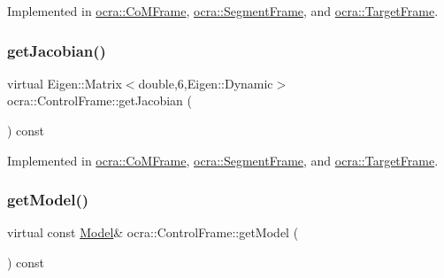 Implemented in \hyperlink{classocra_1_1CoMFrame_a9e59ca65720c553da5c75f484544829c}{ocra\+::\+Co\+M\+Frame}, \hyperlink{classocra_1_1SegmentFrame_aa8f7f9544b59da591d94ac8e6a8a9e5d}{ocra\+::\+Segment\+Frame}, and \hyperlink{classocra_1_1TargetFrame_ab38d91f0d2f90b102259ec155a8a1245}{ocra\+::\+Target\+Frame}.

\hypertarget{classocra_1_1ControlFrame_a14e0b855979be5dbd360314f25191e77}{}\label{classocra_1_1ControlFrame_a14e0b855979be5dbd360314f25191e77} 
\subsubsection{\texorpdfstring{get\+Jacobian()}{getJacobian()}}
{\footnotesize\ttfamily virtual Eigen\+::\+Matrix$<$double,6,Eigen\+::\+Dynamic$>$ ocra\+::\+Control\+Frame\+::get\+Jacobian (\begin{DoxyParamCaption}{ }\end{DoxyParamCaption}) const\hspace{0.3cm}{\ttfamily [pure virtual]}}



Implemented in \hyperlink{classocra_1_1CoMFrame_ab24f3400af3e8eb2a12d6597ff8a7a31}{ocra\+::\+Co\+M\+Frame}, \hyperlink{classocra_1_1SegmentFrame_a1ece38dd51a3331dfe3de7911ad9291e}{ocra\+::\+Segment\+Frame}, and \hyperlink{classocra_1_1TargetFrame_a94d2746633b7112afae754370a3a3e1f}{ocra\+::\+Target\+Frame}.

\hypertarget{classocra_1_1ControlFrame_ab8a1e5e3d96d7524112b4c88bf0bc5ee}{}\label{classocra_1_1ControlFrame_ab8a1e5e3d96d7524112b4c88bf0bc5ee} 
\subsubsection{\texorpdfstring{get\+Model()}{getModel()}}
{\footnotesize\ttfamily virtual const \hyperlink{classocra_1_1Model}{Model}\& ocra\+::\+Control\+Frame\+::get\+Model (\begin{DoxyParamCaption}{ }\end{DoxyParamCaption}) const\hspace{0.3cm}{\ttfamily [pure virtual]}}



